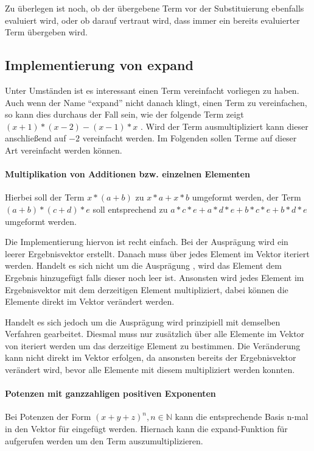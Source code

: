 \documentclass[11pt,a4paper, ngerman]{article}
\begin{document}
Zu überlegen ist noch, ob der übergebene Term vor der Substituierung ebenfalls evaluiert wird, oder ob darauf vertraut wird, dass immer ein bereits evaluierter Term übergeben wird.

\subsection{Implementierung von expand}
Unter Umständen ist es interessant einen Term vereinfacht vorliegen zu haben. Auch wenn der Name ``expand'' nicht danach klingt, einen Term zu vereinfachen, so kann dies durchaus der Fall sein, wie der folgende Term zeigt $(x + 1)*(x - 2) - (x - 1)*x$ \cite{SymPyExpand}. Wird der Term ausmultipliziert kann dieser anschließend auf $-2$ vereinfacht werden. Im Folgenden sollen Terme auf dieser Art vereinfacht werden können.

\paragraph{Multiplikation von Additionen bzw. einzelnen Elementen} Hierbei soll der Term $x*(a+b)$ zu $x*a+x*b$ umgeformt werden, der Term $(a+b)*(c+d)*e$ soll entsprechend zu $a*c*e + a*d*e + b*c*e + b*d*e$ umgeformt werden.

Die Implementierung hiervon ist recht einfach. Bei der Ausprägung  wird ein leerer Ergebnisvektor erstellt. Danach muss über jedes Element im Vektor iteriert werden. Handelt es sich nicht um die Ausprägung , wird das Element dem Ergebnis hinzugefügt falls dieser noch leer ist. Ansonsten wird jedes Element im Ergebnisvektor mit dem derzeitigen Element multipliziert, dabei können die Elemente direkt im Vektor verändert werden.

Handelt es sich jedoch um die Ausprägung  wird prinzipiell mit demselben Verfahren gearbeitet. Diesmal muss nur zusätzlich über alle Elemente im Vektor von  iteriert werden um das derzeitige Element zu bestimmen. Die Veränderung kann nicht direkt im Vektor erfolgen, da ansonsten bereits der Ergebnisvektor verändert wird, bevor alle Elemente mit diesem multipliziert werden konnten.

\paragraph{Potenzen mit ganzzahligen positiven Exponenten} Bei Potenzen der Form $(x+y+z)^n, n \in \mathbb{N}$ kann die entsprechende Basis n-mal in den Vektor für  eingefügt werden. Hiernach kann die expand-Funktion für  aufgerufen werden um den Term auszumultiplizieren. 
\end{document}
